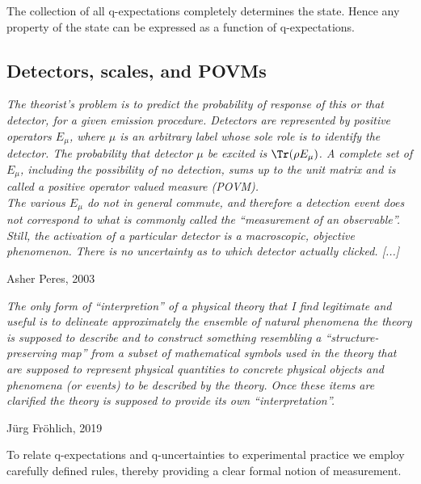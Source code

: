 \documentclass[12pt]{article}
\begin{document}
The collection of all q-expectations completely determines the state.
Hence any property of the state can be expressed as a function of
q-expectations.



\subsection{Detectors, scales, and POVMs}\label{ss.detectors}

\nopagebreak
\hfill\parbox[t]{10.8cm}{\footnotesize

{\em
The theorist's problem is to predict the probability of response of this
or that detector, for a given emission procedure. Detectors are
represented by positive operators $E_\mu$, where $\mu$ is an arbitrary
label whose sole role is to identify the detector. The probability that
detector $\mu$ be excited is $\Tr(\rho E_\mu)$. A complete set of
$E_\mu$, including the possibility of no detection, sums up to the unit
matrix and is called a positive operator valued measure (POVM).
\\
The various $E_\mu$ do not in general commute, and therefore a
detection event does not correspond to what is commonly called the
``measurement of an observable''. Still, the activation of a particular
detector is a macroscopic, objective phenomenon. There is no
uncertainty as to which detector actually clicked. [...]}

\hfill Asher Peres, 2003 \cite[p.1545]{Per2003}
}

\bigskip

\nopagebreak
\hfill\parbox[t]{10.8cm}{\footnotesize

{\em
The only form of ``interpretion'' of a physical theory that I find
legitimate and useful is to delineate approximately the ensemble of
 natural phenomena the theory is supposed to describe and to construct
something resembling a ``structure-preserving map'' from a subset of
mathematical symbols used in the theory that are supposed to represent
physical quantities to concrete physical objects and phenomena
(or events) to be described by the theory. Once these items are
clarified the theory is supposed to provide its own ``interpretation''.
}

\hfill J\"urg Fr\"ohlich, 2019 \cite[p.3]{Fro2019r}
}

\bigskip

To relate q-expectations and q-uncertainties to experimental practice
we employ carefully defined rules, thereby providing a clear formal
notion of measurement.
\end{document}
